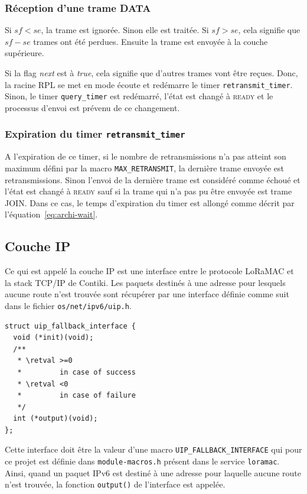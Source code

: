     \subsubsection*{Réception d'une trame DATA}
        Si $sf<se$, la trame est ignorée. Sinon elle est traitée. Si $sf > se$, cela signifie que $sf - se$ trames ont été perdues. Ensuite la trame est envoyée à la couche supérieure.

        Si la flag \textit{next} est à \textit{true}, cela signifie que d'autres trames vont être reçues. Donc, la racine RPL se met en mode écoute et redémarre le timer \texttt{retransmit\_timer}. Sinon, le timer \texttt{query\_timer} est redémarré, l'état est changé à \textsc{ready} et le processus d'envoi est prévenu de ce changement.

    \subsubsection*{Expiration du timer \texttt{retransmit\_timer}}
        A l'expiration de ce timer, si le nombre de retransmissions n'a pas atteint son maximum 
        défini par la macro \texttt{MAX\_RETRANSMIT}, la dernière trame envoyée est retransmissions.
        Sinon l'envoi de la dernière trame est considéré comme échoué et l'état est changé à \textsc
        {ready} sauf si la trame qui n'a pas pu être envoyée est trame JOIN. Dans ce cas, le temps 
        d'expiration du timer est allongé comme décrit par l'équation~\ref{eq:archi-wait}.

\subsection*{Couche IP}
    Ce qui est appelé la couche IP est une interface entre le protocole LoRaMAC et la stack TCP/IP de Contiki. Les paquets destinés à une adresse pour lesquels aucune route n'est trouvée sont récupérer par une interface définie comme suit dans le fichier \texttt{os/net/ipv6/uip.h}.
    \begin{verbatim}
struct uip_fallback_interface {
  void (*init)(void);
  /**
   * \retval >=0
   *         in case of success
   * \retval <0
   *         in case of failure
   */
  int (*output)(void);
};
    \end{verbatim}
    Cette interface doit être la valeur d'une macro \texttt{UIP\_FALLBACK\_INTERFACE} qui pour ce projet est définie dans \texttt{module-macros.h} présent dans le service \texttt{loramac}.
    Ainsi, quand un paquet IPv6 est destiné à une adresse pour laquelle aucune route n'est trouvée, la fonction  \texttt{output()} de l'interface est appelée.

